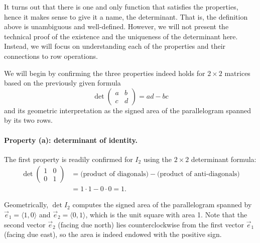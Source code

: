 \documentclass{ximera}
\begin{document}
It turns out that there is one and only function that satisfies the
properties, hence it makes sense to give it a name, the
determinant. That is, the definition above is unambiguous and
well-defined. However, we will not present the technical proof of the
existence and the uniqueness of the determinant here. Instead, we will
focus on understanding each of the properties and their connections to
row operations.

We will begin by confirming the three properties indeed holds for
$2 \times 2$ matrices based on the previously given formula
\[
  \det
  \begin{pmatrix}
    a & b \\ c & d
  \end{pmatrix}
  = ad - bc
\]
and its geometric interpretation as the signed area of the
parallelogram spanned by its two rows.

\paragraph{Property (a): determinant of identity.}
The first property is readily confirmed for $I_2$ using the
$2 \times 2$ determinant formula:
\begin{align*}
  \det
  \begin{pmatrix}
    1 & 0 \\ 0 & 1
  \end{pmatrix}
  & = \text{(product of diagonals)} - \text{(product of
    anti-diagonals)} \\
      & = 1 \cdot 1 - 0 \cdot 0 = 1.
\end{align*}

Geometrically, $\det I_2$ computes the signed area of the
parallelogram spanned by $\vec{e}_1 = \langle 1, 0 \rangle$ and
$\vec{e}_2 = \langle 0, 1 \rangle$, which is the unit square with area
1. Note that the second vector $\vec{e}_2$ (facing due
north) lies counterclockwise from the first vector
$\vec{e}_1$ (facing due east), so the area is indeed
endowed with the positive sign.
\end{document}
